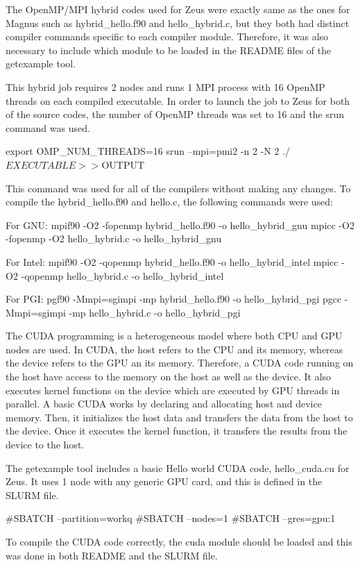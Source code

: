\begin{Document}
The OpenMP/MPI hybrid codes used for Zeus were exactly same as the ones for Magnus such as hybrid_hello.f90 and hello_hybrid.c, but they both had
distinct compiler commands specific to each compiler module. Therefore, it was also necessary to include which module to be loaded in the README files
of the getexample tool.

This hybrid job requires 2 nodes and runs 1 MPI process with 16 OpenMP threads on each compiled executable. In order to launch the job to Zeus for both 
of the source codes, the number of OpenMP threads was set to 16 and the srun command was used.

export OMP_NUM_THREADS=16
srun --mpi=pmi2 -n 2 -N 2 ./$EXECUTABLE >> ${OUTPUT}

This command was used for all of the compilers without making any changes. To compile the hybrid_hello.f90 and hello.c, the following commands were used:

For GNU:
mpif90 -O2 -fopenmp hybrid_hello.f90 -o hello_hybrid_gnu
mpicc -O2 -fopenmp -O2 hello_hybrid.c -o hello_hybrid_gnu

For Intel:
mpif90 -O2 -qopenmp hybrid_hello.f90 -o hello_hybrid_intel
mpicc -O2 -qopenmp hello_hybrid.c -o hello_hybrid_intel

For PGI:
pgf90 -Mmpi=sgimpi -mp hybrid_hello.f90 -o hello_hybrid_pgi
pgcc -Mmpi=sgimpi -mp hello_hybrid.c -o hello_hybrid_pgi


The CUDA programming is a heterogeneous model where both CPU and GPU nodes are used. In CUDA, the host refers to the CPU and its memory, whereas the 
device refers to the GPU an its memory. Therefore, a CUDA code running on the host have access to the memory on the host as well as the device. It also 
executes kernel functions on the device which are executed by GPU threads in parallel. A basic CUDA works by declaring and allocating host and device 
memory. Then, it initializes the host data and transfers the data from the host to the device. Once it executes the kernel function, it transfers the 
results from the device to the host.

The getexample tool includes a basic Hello world CUDA code, hello_cuda.cu for Zeus. It uses 1 node with any generic GPU card, and this is defined in the 
SLURM file.

#SBATCH --partition=workq
#SBATCH --nodes=1
#SBATCH --gres=gpu:1

To compile the CUDA code correctly, the cuda module should be loaded and this was done in both README and the SLURM file.


\end{Document}
